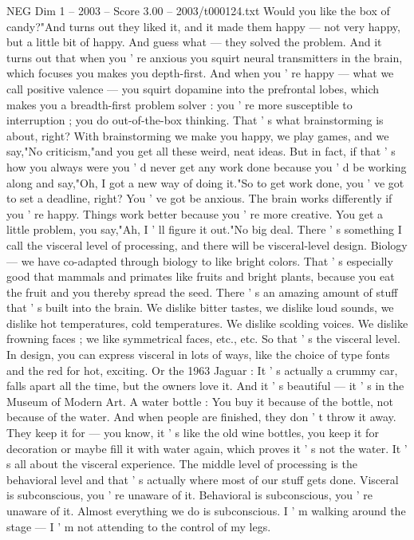 \begin{textsample}{NEG Dim 1 – 2003 – Score 3.00 – 2003/t000124.txt}
Would you like the box of candy?"And turns out they liked it, and it made them happy — not very happy, but a little bit of happy.
And guess what — they solved the problem.
And it turns out that when you ' re anxious you squirt neural transmitters in the brain, which focuses you makes you depth-first.
And when you ' re happy — what we call positive valence — you squirt dopamine into the prefrontal lobes, which makes you a breadth-first problem solver : you ' re more susceptible to interruption ; you do out-of-the-box thinking.
That ' s what brainstorming is about, right?
With brainstorming we make you happy, we play games, and we say,"No criticism,"and you get all these weird, neat ideas.
But in fact, if that ' s how you always were you ' d never get any work done because you ' d be working along and say,"Oh, I got a new way of doing it."So to get work done, you ' ve got to set a deadline, right?
You ' ve got be anxious.
The brain works differently if you ' re happy.
Things work better because you ' re more creative.
You get a little problem, you say,"Ah, I ' ll figure it out."No big deal.
There ' s something I call the visceral level of processing, and there will be visceral-level design.
Biology — we have co-adapted through biology to like bright colors.
That ' s especially good that mammals and primates like fruits and bright plants, because you eat the fruit and you thereby spread the seed.
There ' s an amazing amount of stuff that ' s built into the brain.
We dislike bitter tastes, we dislike loud sounds, we dislike hot temperatures, cold temperatures.
We dislike scolding voices.
We dislike frowning faces ; we like symmetrical faces, etc., etc.
So that ' s the visceral level.
In design, you can express visceral in lots of ways, like the choice of type fonts and the red for hot, exciting.
Or the 1963 Jaguar : It ' s actually a crummy car, falls apart all the time, but the owners love it.
And it ' s beautiful — it ' s in the Museum of Modern Art.
A water bottle : You buy it because of the bottle, not because of the water.
And when people are finished, they don ' t throw it away.
They keep it for — you know, it ' s like the old wine bottles, you keep it for decoration or maybe fill it with water again, which proves it ' s not the water.
It ' s all about the visceral experience.
The middle level of processing is the behavioral level and that ' s actually where most of our stuff gets done.
Visceral is subconscious, you ' re unaware of it.
Behavioral is subconscious, you ' re unaware of it.
Almost everything we do is subconscious.
I ' m walking around the stage — I ' m not attending to the control of my legs.

\end{textsample}
